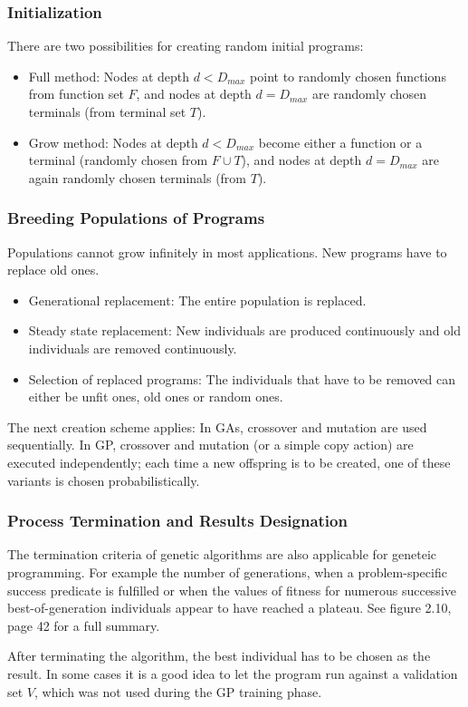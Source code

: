 \documentclass[12pt]{article}
\begin{document}
\subsubsection{Initialization}
There are two possibilities for creating random initial programs:
\begin{itemize}
\item Full method: Nodes at depth $d < D_{max}$ point to randomly chosen functions from function set $F$, and nodes at depth $d = D_{max}$ are randomly chosen terminals (from terminal set $T$).
\item Grow method: Nodes at depth $d < D_{max}$ become either a function or a terminal (randomly chosen from $F \cup T$), and nodes at depth $d = D_{max}$ are again randomly chosen terminals (from $T$).
\end{itemize}
\subsubsection{Breeding Populations of Programs}
Populations cannot grow infinitely in most applications. New programs have to replace old ones.
\begin{itemize}
\item Generational replacement: The entire population is replaced.
\item Steady state replacement: New individuals are produced continuously and old individuals are removed continuously.
\item Selection of replaced programs: The individuals that have to be removed can either be unfit ones, old ones or random ones.
\end{itemize}
The next creation scheme applies: In GAs, crossover and mutation are used sequentially. In GP, crossover and mutation (or a simple copy action) are executed independently; each time a new offspring is to be created, one of these variants is chosen probabilistically.
\subsubsection{Process Termination and Results Designation}
\label{sec:2.3.4}
The termination criteria of genetic algorithms are also applicable for geneteic programming. For example the number of generations, when a problem-specific success predicate is fulfilled or when the values of fitness for numerous successive best-of-generation individuals appear to have reached a plateau. See figure 2.10, page 42 for a full summary.

After terminating the algorithm, the best individual has to be chosen as the result. In some cases it is a good idea to let the program run against a validation set $V$, which was not used during the GP training phase.
\end{document}
